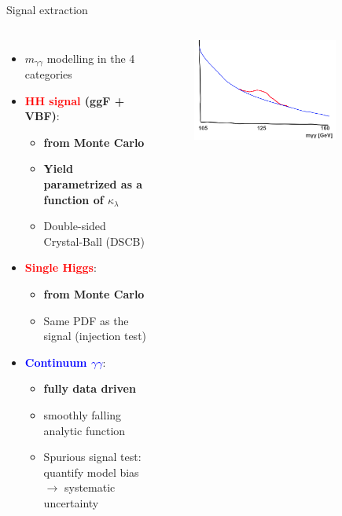 \begin{frame}{Signal extraction}
\begin{columns}
    
\begin{itemize}
    \item \textcolor{structurColor}{$m_{\gamma\gamma}$ modelling in the 4 categories}
    \item \textbf{\textcolor{red}{HH signal} (ggF + VBF)}: 
    \begin{itemize}
        \item \textbf{from Monte Carlo}
        \item \textbf{Yield parametrized as a function of $\kappa_{\lambda}$}
        \item Double-sided Crystal-Ball (DSCB)
    \end{itemize}
    \item \textbf{\textcolor{red}{Single Higgs}}: 
    \begin{itemize}
        \item \textbf{from Monte Carlo}
        \item Same PDF as the signal (injection test)
    \end{itemize}
    \item \textbf{\textcolor{blue}{Continuum $\gamma\gamma$}}:
    \begin{itemize}
        \item \textbf{fully data driven}
        \item smoothly falling analytic function 
        \item Spurious signal test: quantify model bias $\to$ systematic uncertainty
    \end{itemize}
\end{itemize}    
    
\begin{figure}
    \centering
    \includegraphics[width=0.8\textwidth]{Part3/Img/myysketch.png}
\end{figure}
\end{columns}
    
\end{frame}

